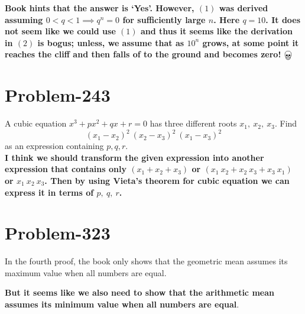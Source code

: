 \documentclass[12pt]{article}
\begin{document}
\textbf{Book hints that the answer is `Yes'. However, $(1)$ was derived assuming $0 < q < 1 \implies q^n = 0$ for sufficiently large $n$. Here $q = 10$. It does not seem like we could use $(1)$ and thus it seems like the derivation in $(2)$ is bogus; unless, we assume that as $10^n$ grows, at some point it reaches the cliff and then falls of to the ground and becomes zero! $\bigskull$}

\section*{Problem-243}
A cubic equation $x^3 + px^2 + qx +r = 0$ has three different roots $x_1,\ x_2,\ x_3$. Find
\[
	(x_1 - x_2)^2\ (x_2 - x_3)^2\ (x_1 - x_3)^2
\]
as an expression containing $p, q, r$.\\

\textbf{I think we should transform the given expression into another expression that contains only $(x_1 + x_2 + x_3)$ or $(x_1\ x_2 + x_2\ x_3 + x_3\ x_1)$ or $x_1\ x_2\ x_3$. Then by using Vieta's theorem for cubic equation we can express it in terms of $p,\ q,\ r$.}

\section*{Problem-323}
In the fourth proof, the book only shows that the geometric mean assumes its maximum value when all numbers are equal. 

\textbf{But it seems like we also need to show that the arithmetic mean assumes its minimum value when all numbers are equal}.
\end{document}
